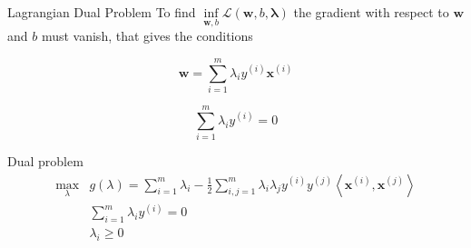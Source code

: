 \documentclass{beamer}
\begin{document}
\begin{frame}{Lagrangian Dual Problem}
    To find $\inf\limits_{\mathbf{w}, b} \mathcal{L} (\mathbf{w}, b, \mathbf{\lambda})$
    the gradient with respect to $\mathbf{w}$ and $b$ must vanish, that gives the
    conditions

    \begin{equation}
        \mathbf{w} = \sum\limits^m_{i=1} \lambda_i y^{(i)} \mathbf{x}^{(i)}
        \label{cond1}
    \end{equation}

    \begin{equation}
        \sum\limits^m_{i=1} \lambda_i y^{(i)} = 0
        \label{cond2}
    \end{equation}
    

    \begin{block}{Dual problem}
        \vspace{-.4cm}
        \begin{equation}
            \begin{array}{ll}
                \max_\lambda & g(\lambda) = \sum\limits^m_{i=1} \lambda_i -
                \frac{1}{2} \sum\limits^m_{i,j=1} \lambda_i \lambda_j y^{(i)} y^{(j)}
                \left< \mathbf{x}^{(i)}, \mathbf{x}^{(j)} \right> \\[.2cm]
                & \sum\limits^m_{i=1} \lambda_i y^{(i)} = 0 \\[.3cm]
                & \lambda_i \ge 0
            \end{array}
        \end{equation}
    \end{block}
\end{frame}
\end{document}
